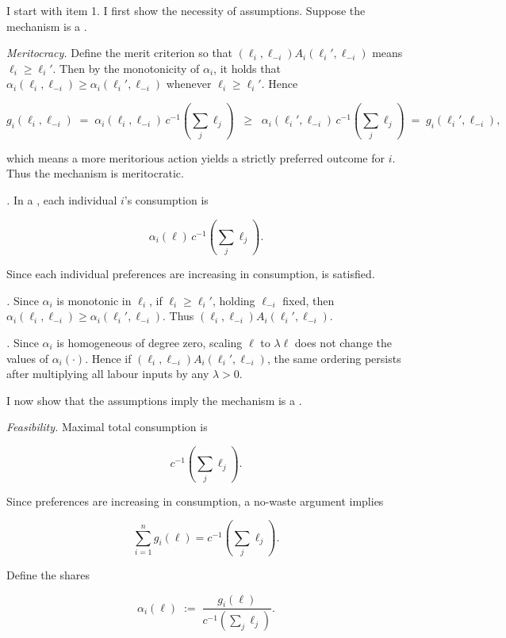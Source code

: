 \begin{propproof}
	I start with item 1. I first show the necessity of assumptions. Suppose the mechanism is a .

	\emph{Meritocracy.} Define the merit criterion so that \((\ell_i,\ell_{-i}) A_i (\ell_i',\ell_{-i})\) means \(\ell_i\ge\ell_i'\). Then by the monotonicity of \(\alpha_i\), it holds that \(\alpha_i(\ell_i,\ell_{-i}) \ge \alpha_i(\ell_i',\ell_{-i})\) whenever \(\ell_i\ge\ell_i'\). Hence

	\[
		g_i(\ell_i,\ell_{-i})
		\;=\;\alpha_i(\ell_i,\ell_{-i})\,c^{-1} \left(\sum_j \ell_j\right)
		\;\;\ge\;\;
		\alpha_i(\ell_i',\ell_{-i})\,c^{-1} \left(\sum_j \ell_j\right)
		\;=\;g_i(\ell_i',\ell_{-i}),
	\]

	which means a more meritorious action yields a strictly preferred outcome for \(i\). Thus the mechanism is meritocratic.

	\emph{.}
	In a , each individual \(i\)'s consumption is

	\[ \alpha_i(\ell)\,c^{-1} \left( \sum_j\ell_j \right) . \]

	Since each individual preferences are increasing in consumption,  is satisfied.

	\emph{.}
	Since \(\alpha_i\) is monotonic in \(\ell_i\), if \(\ell_i\ge\ell_i'\), holding \(\ell_{-i}\) fixed,  then \(\alpha_i(\ell_i,\ell_{-i}) \ge \alpha_i(\ell_i',\ell_{-i})\). Thus \((\ell_i,\ell_{-i}) A_i (\ell_i',\ell_{-i})\).

	\emph{.}
	Since \(\alpha_i\) is homogeneous of degree zero, scaling \(\ell \) to \( \lambda \ell \) does not change the values of \(\alpha_i(\cdot)\). Hence if \((\ell_i,\ell_{-i}) A_i (\ell_i',\ell_{-i})\),	the same ordering persists after multiplying all labour inputs by any \(\lambda>0\).

	I now show that the assumptions imply the mechanism is a .

	\emph{Feasibility.}
	Maximal total consumption is

	\[ c^{-1} \left( \sum_j \ell_j \right) .\]

	Since preferences are increasing in consumption, a no-waste argument implies

	\[ \sum_{i=1}^n g_i(\ell)= c^{-1} \left( \sum_j \ell_j \right) .\]

	Define the shares

	\[
		\alpha_i(\ell)
		\;:=\;
		\frac{\,g_i(\ell)\,}
		{c^{-1} \left( \sum_j\ell_j \right)}.
	\]


\end{propproof}
